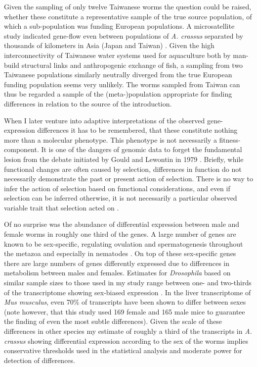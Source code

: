 Given the sampling of only twelve Taiwanese worms the question could
be raised, whether these constitute a representative sample of the
true source population, of which a sub-population was funding European
populations. A microsatellite study indicated gene-flow even between
populations of \textit{A. crassus} separated by thousands of
kilometers in Asia (Japan and Taiwan)
\cite{wielgoss_population_2008}. Given the high interconnectivity of
Taiwanese water systems used for aquaculture both by man-build
structural links and anthropogenic exchange of fish, a sampling from
two Taiwanese populations similarly neutrally diverged from the true
European funding population seems very unlikely. The worms sampled
from Taiwan can thus be regarded a sample of the (meta-)population
appropriate for finding differences in relation to the source of the
introduction.

When I later venture into adaptive interpretations of the observed
gene-expression differences it has to be remembered, that these
constitute nothing more than a molecular phenotype. This phenotype is
not necessarily a fitness-component. It is one of the dangers of
genomic data to forget the fundamental lesion from the debate
initiated by Gould and Lewontin in 1979
\cite{gould_spandrels_1979}. Briefly, while functional changes are
often caused by selection, differences in function do not necessarily
demonstrate the past or present action of selection. There is no way
to infer the action of selection based on functional considerations,
and even if selection can be inferred otherwise, it is not necessarily
a particular observed variable trait that selection acted on
\cite{pmid19744124}.

Of no surprise was the abundance of differential expression between
male and female worms in roughly one third of the genes. A large
number of genes are known to be sex-specific, regulating ovulation and
spermatogenesis throughout the metazoa and especially in nematodes
\cite{pmid15371532}. On top of these sex-specific genes there are
large numbers of genes differently expressed due to differences in
metabolism between males and females. Estimates for
\textit{Drosophila} based on similar sample sizes to those used in my
study range between one- and two-thirds of the transcriptome showing
sex-biased expression \cite{pmid11726925}. In the liver transcriptome
of \textit{Mus musculus}, even 70\% of transcripts have been shown to
differ between sexes \cite{pmid16825664} (note however, that this
study used 169 female and 165 male mice to guarantee the finding of
even the most subtle differences). Given the scale of these
differences in other species my estimate of roughly a third of the
transcripts in \textit{A. crassus} showing differential expression
according to the sex of the worms implies conservative thresholds used
in the statistical analysis and moderate power for detection of
differences.

